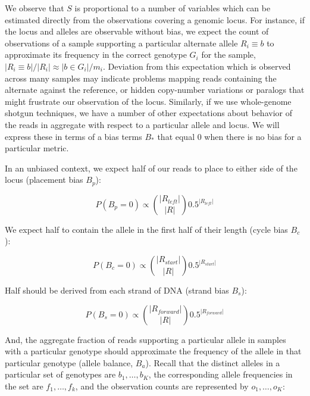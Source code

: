 \documentclass{article}
\begin{document}
We observe that $S$ is proportional to a number of variables which can be estimated directly from the observations covering a genomic locus.  For instance, if the locus and alleles are observable without bias, we expect the count of observations of a sample supporting a particular alternate allele $R_i \equiv b$ to approximate its frequency in the correct genotype $G_i$ for the sample, $|R_i \equiv b|/|R_i| \approx |b \in G_i|/m_i$.  Deviation from this expectation which is observed across many samples may indicate problems mapping reads containing the alternate against the reference, or hidden copy-number variations or paralogs that might frustrate our observation of the locus.  Similarly, if we use whole-genome shotgun techniques, we have a number of other expectations about behavior of the reads in aggregate with respect to a particular allele and locus.  We will express these in terms of a bias terms $B_*$ that equal $0$ when there is no bias for a particular metric.

In an unbiased context, we expect half of our reads to place to either side of the locus (placement bias $B_p$):

\begin{equation}
P(B_p = 0) \propto \binom{|R_{left}|}{|R|} 0.5^{|R_{left}|}
\end{equation}

We expect half to contain the allele in the first half of their length (cycle bias $B_c$):

\begin{equation}
P(B_c = 0) \propto \binom{|R_{start}|}{|R|} 0.5^{|R_{start}|}
\end{equation}

Half should be derived from each strand of DNA (strand bias $B_s$):

\begin{equation}
P(B_s = 0) \propto  \binom{|R_{forward}|}{|R|} 0.5^{|R_{forward}|}
\end{equation}

And, the aggregate fraction of reads supporting a particular allele in samples with a particular genotype should approximate the frequency of the allele in that particular genotype (allele balance, $B_a$).  Recall that the distinct alleles in a particular set of genotypes are $b_1,\ldots,b_K$, the corresponding allele frequencies in the set are $f_1,\ldots,f_k$, and the observation counts are represented by $o_1,\ldots,o_K$:

\end{document}
